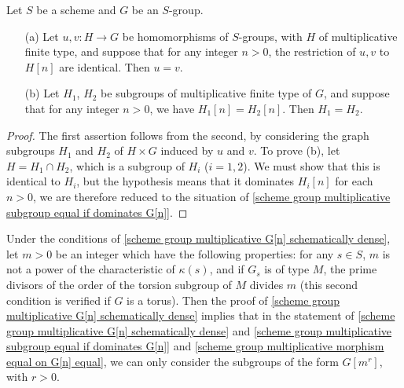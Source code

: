 \begin{corollary}\label{scheme group multiplicative morphism equal on G[n] equal}
Let $S$ be a scheme and $G$ be an $S$-group.
\begin{enumerate}
    \item[(a)] Let $u,v:H\to G$ be homomorphisms of $S$-groups, with $H$ of multiplicative finite type, and suppose that for any integer $n>0$, the restriction of $u,v$ to $H[n]$ are identical. Then $u=v$.
    \item[(b)] Let $H_1$, $H_2$ be subgroups of multiplicative finite type of $G$, and suppose that for any integer $n>0$, we have $H_1[n]=H_2[n]$. Then $H_1=H_2$.  
\end{enumerate}
\end{corollary}
\begin{proof}
The first assertion follows from the second, by considering the graph subgroups $H_1$ and $H_2$ of $H\times G$ induced by $u$ and $v$. To prove (b), let $H=H_1\cap H_2$, which is a subgroup of $H_i$ ($i=1,2$). We must show that this is identical to $H_i$, but the hypothesis means that it dominates $H_i[n]$ for each $n>0$, we are therefore reduced to the situation of \cref{scheme group multiplicative subgroup equal if dominates G[n]}.
\end{proof}

\begin{remark}
Under the conditions of \cref{scheme group multiplicative G[n] schematically dense}, let $m>0$ be an integer which have the following properties: for any $s\in S$, $m$ is not a power of the characteristic of $\kappa(s)$, and if $G_s$ is of type $M$, the prime divisors of the order of the torsion subgroup of $M$ divides $m$ (this second condition is verified if $G$ is a torus). Then the proof of \cref{scheme group multiplicative G[n] schematically dense} implies that in the statement of \cref{scheme group multiplicative G[n] schematically dense} and \cref{scheme group multiplicative subgroup equal if dominates G[n]} and \cref{scheme group multiplicative morphism equal on G[n] equal}, we can only consider the subgroups of the form $G[m^r]$, with $r>0$.
\end{remark}

